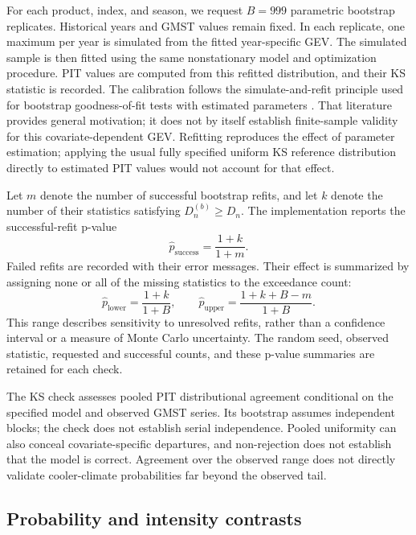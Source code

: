 \documentclass[11pt]{article}
\begin{document}
For each product, index, and season, we request $B=999$ parametric
bootstrap replicates. Historical years and GMST values remain fixed.
In each replicate, one maximum per year is simulated from the fitted
year-specific GEV. The simulated sample is then fitted using the same
nonstationary model and optimization procedure. PIT values are
computed
from this refitted distribution, and their KS statistic is recorded.
The calibration follows the simulate-and-refit principle used for
bootstrap goodness-of-fit tests with estimated parameters
\cite{stute1993bootstrap}. That literature provides general
motivation; it does
not by itself establish finite-sample validity for this
covariate-dependent
GEV. Refitting reproduces the effect of parameter estimation; applying
the
usual fully specified uniform KS reference distribution directly to
estimated PIT values would not account for that effect.

Let $m$ denote the number of successful bootstrap refits, and let $k$
denote the number of their statistics satisfying $D_n^{(b)}\geq D_n$.
The implementation reports the successful-refit p-value
\begin{equation}
\widehat p_{\mathrm{success}}=\frac{1+k}{1+m}.
\end{equation}
Failed refits are recorded with their error messages. Their effect is
summarized by assigning none or all of the missing statistics to the
exceedance count:
\begin{equation}
\widehat p_{\mathrm{lower}}=\frac{1+k}{1+B},\qquad
\widehat p_{\mathrm{upper}}=\frac{1+k+B-m}{1+B}.
\end{equation}
This range describes sensitivity to unresolved refits, rather than a
confidence interval or a measure of Monte Carlo uncertainty. The
random
seed, observed statistic, requested and successful counts, and these
p-value summaries are retained for each check.

The KS check assesses pooled PIT distributional agreement conditional
on the specified model and observed GMST series. Its bootstrap assumes
independent blocks; the check does not establish serial independence.
Pooled uniformity can also conceal covariate-specific departures, and
non-rejection does not establish that the model is correct. Agreement
over the observed range does not directly validate cooler-climate
probabilities far beyond the observed tail.

\subsection{Probability and intensity contrasts}
\label{sec:contrasts}
\end{document}
